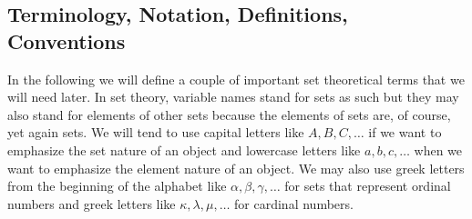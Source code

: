 



\subsection{Terminology, Notation, Definitions, Conventions}
In the following we will define a couple of important set theoretical terms that we will need later. In set theory, variable names stand for sets as such but they may also stand for elements of other sets because the elements of sets are, of course, yet again sets. We will tend to use capital letters like $A,B,C,\ldots$ if we want to emphasize the set nature of an object and lowercase letters like $a,b,c,\ldots$ when we want to emphasize the element nature of an object. We may also use greek letters from the beginning of the alphabet like $\alpha,\beta,\gamma, \ldots$ for sets that represent ordinal numbers and greek letters like $\kappa,\lambda,\mu,\ldots$ for cardinal numbers.







